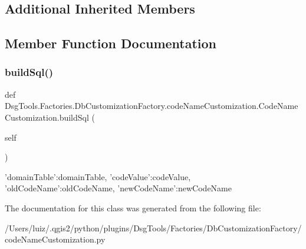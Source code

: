 \subsection*{Additional Inherited Members}


\subsection{Member Function Documentation}
\mbox{\label{class_dsg_tools_1_1_factories_1_1_db_customization_factory_1_1code_name_customization_1_1_code_name_customization_a2a3c553977adaad5a53c60e9fe9809e2}} 
\subsubsection{\texorpdfstring{build\+Sql()}{buildSql()}}
{\footnotesize\ttfamily def Dsg\+Tools.\+Factories.\+Db\+Customization\+Factory.\+code\+Name\+Customization.\+Code\+Name\+Customization.\+build\+Sql (\begin{DoxyParamCaption}\item[{}]{self }\end{DoxyParamCaption})}

\begin{DoxyVerb}{'domainTable':domainTable, 'codeValue':codeValue, 'oldCodeName':oldCodeName, 'newCodeName':newCodeName}
\end{DoxyVerb}
 

The documentation for this class was generated from the following file\+:\begin{DoxyCompactItemize}
\item 
/\+Users/luiz/.\+qgis2/python/plugins/\+Dsg\+Tools/\+Factories/\+Db\+Customization\+Factory/code\+Name\+Customization.\+py\end{DoxyCompactItemize}
